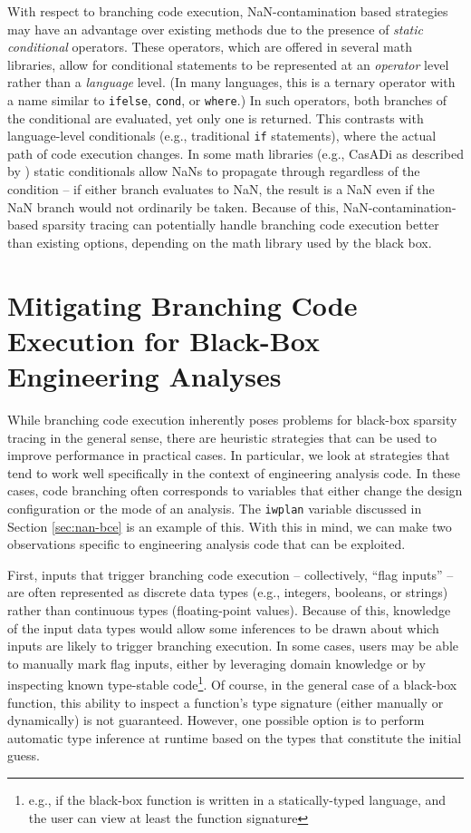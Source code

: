 \documentclass{article}
\begin{document}
With respect to branching code execution, NaN-contamination based strategies may have an advantage over existing methods due to the presence of \emph{static conditional} operators. These operators, which are offered in several math libraries, allow for conditional statements to be represented at an \emph{operator} level rather than a \emph{language} level. (In many languages, this is a ternary operator with a name similar to \texttt{ifelse}, \texttt{cond}, or \texttt{where}.) In such operators, both branches of the conditional are evaluated, yet only one is returned. This contrasts with language-level conditionals (e.g., traditional \texttt{if} statements), where the actual path of code execution changes. In some math libraries (e.g., CasADi as described by \cite{anderssonCasADiSoftwareFramework2019}) static conditionals allow NaNs to propagate through regardless of the condition -- if either branch evaluates to NaN, the result is a NaN even if the NaN branch would not ordinarily be taken. Because of this, NaN-contamination-based sparsity tracing can potentially handle branching code execution better than existing options, depending on the math library used by the black box.


\section{Mitigating Branching Code Execution for Black-Box Engineering Analyses}
\label{sec:mitigation}

While branching code execution inherently poses problems for black-box sparsity tracing in the general sense, there are heuristic strategies that can be used to improve performance in practical cases. In particular, we look at strategies that tend to work well specifically in the context of engineering analysis code. In these cases, code branching often corresponds to variables that either change the design configuration or the mode of an analysis. The \texttt{iwplan} variable discussed in Section \ref{sec:nan-bce} is an example of this. With this in mind, we can make two observations specific to engineering analysis code that can be exploited.

First, inputs that trigger branching code execution -- collectively, ``flag inputs'' -- are often represented as discrete data types (e.g., integers, booleans, or strings) rather than continuous types (floating-point values). Because of this, knowledge of the input data types would allow some inferences to be drawn about which inputs are likely to trigger branching execution. In some cases, users may be able to manually mark flag inputs, either by leveraging domain knowledge or by inspecting known type-stable code\footnote{e.g., if the black-box function is written in a statically-typed language, and the user can view at least the function signature}. Of course, in the general case of a black-box function, this ability to inspect a function's type signature (either manually or dynamically) is not guaranteed. However, one possible option is to perform automatic type inference at runtime based on the types that constitute the initial guess.
\end{document}
